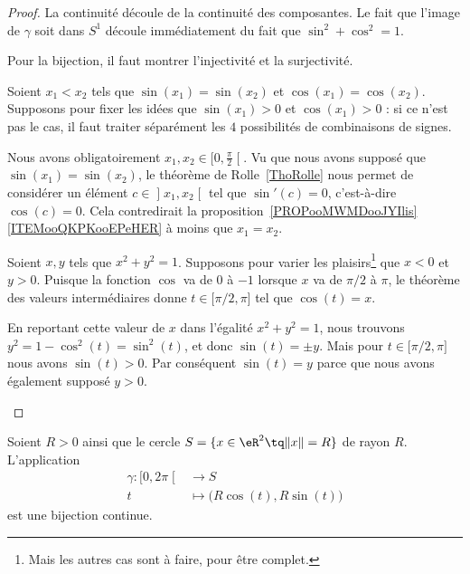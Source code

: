 \begin{proof}
	La continuité découle de la continuité des composantes. Le fait que l'image de \( \gamma\) soit dans \( S^1\) découle immédiatement du fait que \( \sin^2+\cos^2=1\).

	Pour la bijection, il faut montrer l'injectivité et la surjectivité.
	\begin{subproof}
		\item[Injectif]
		Soient \( x_1<x_2\) tels que \( \sin(x_1)=\sin(x_2)\) et \( \cos(x_1)=\cos(x_2)\). Supposons pour fixer les idées que \( \sin(x_1)>0\) et \( \cos(x_1)>0\) : si ce n'est pas le cas, il faut traiter séparément les \( 4\) possibilités de combinaisons de signes.

		Nous avons obligatoirement \( x_1,x_2\in\mathopen[ 0 , \frac{ \pi }{ 2 } \mathclose[\). Vu que nous avons supposé que \( \sin(x_1)=\sin(x_2)\), le théorème de Rolle~\ref{ThoRolle} nous permet de considérer un élément \( c\in \mathopen] x_1 , x_2 \mathclose[\) tel que \( \sin'(c)=0\), c'est-à-dire \( \cos(c)=0\). Cela contredirait la proposition~\ref{PROPooMWMDooJYIlis}\ref{ITEMooQKPKooEPeHER} à moins que \( x_1=x_2\).

		\item[Surjectif]

            Soient \( x,y\) tels que \( x^2+y^2=1\). Supposons pour varier les plaisirs\footnote{Mais les autres cas sont à faire, pour être complet.} que \( x<0\) et \( y>0\). Puisque la fonction \( \cos\) va de \( 0\) à \( -1\) lorsque \( x\) va de \( \pi/2\) à \( \pi\), le théorème des valeurs intermédiaires donne \( t\in\mathopen[ \pi/2 , \pi \mathclose]\) tel que \( \cos(t)=x\).

        En reportant cette valeur de \( x\) dans l'égalité \( x^2+y^2=1\), nous trouvons \( y^2=1-\cos^2(t)=\sin^2(t)\), et donc \( \sin(t)=\pm y\). Mais pour \( t\in \mathopen[ \pi/2 , \pi \mathclose]\) nous avons \( \sin(t)>0\). Par conséquent \( \sin(t)=y\) parce que nous avons également supposé \( y>0\).
	\end{subproof}
\end{proof}

\begin{corollary}       \label{CORooAKMKooORqcrO}
	Soient \( R>0\) ainsi que le cercle \( S=\{ x\in \eR^2\tq \| x \|=R \}\) de rayon \( R\). L'application
	\begin{equation}
		\begin{aligned}
			\gamma\colon \mathopen[ 0 , 2\pi \mathclose[ & \to S                                 \\
			t                                            & \mapsto \big( R\cos(t),R\sin(t) \big)
		\end{aligned}
	\end{equation}
	est une bijection continue.
\end{corollary}


